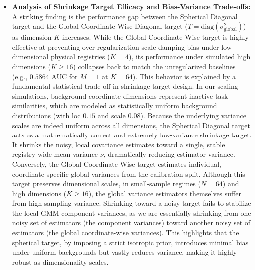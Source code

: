 \begin{itemize}
    \item {\bf Analysis of Shrinkage Target Efficacy and Bias-Variance Trade-offs:} A striking finding is the performance gap between the Spherical Diagonal target and the Global Coordinate-Wise Diagonal target ($T = \text{diag}(\sigma^2_{\text{global}})$) as dimension $K$ increases. While the Global Coordinate-Wise target is highly effective at preventing over-regularization scale-damping bias under low-dimensional physical registries ($K=4$), its performance under simulated high dimensions ($K \ge 16$) collapses back to match the unregularized baselines (e.g., $0.5864$ AUC for $M=1$ at $K=64$). This behavior is explained by a fundamental statistical trade-off in shrinkage target design. In our scaling simulations, background coordinate dimensions represent inactive task similarities, which are modeled as statistically uniform background distributions (with loc $0.15$ and scale $0.08$). Because the underlying variance scales are indeed uniform across all dimensions, the Spherical Diagonal target acts as a mathematically correct and extremely low-variance shrinkage target. It shrinks the noisy, local covariance estimates toward a single, stable registry-wide mean variance $\nu$, dramatically reducing estimator variance. Conversely, the Global Coordinate-Wise target estimates individual, coordinate-specific global variances from the calibration split. Although this target preserves dimensional scales, in small-sample regimes ($N = 64$) and high dimensions ($K \ge 16$), the global variance estimators themselves suffer from high sampling variance. Shrinking toward a noisy target fails to stabilize the local GMM component variances, as we are essentially shrinking from one noisy set of estimators (the component variances) toward another noisy set of estimators (the global coordinate-wise variances). This highlights that the spherical target, by imposing a strict isotropic prior, introduces minimal bias under uniform backgrounds but vastly reduces variance, making it highly robust as dimensionality scales.


\end{itemize}
